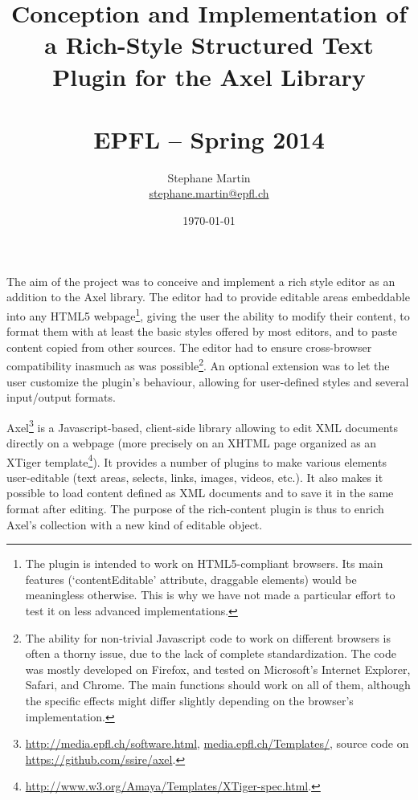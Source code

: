 \documentclass[11pt,a4paper]{article}
\begin{document}
\title{Conception and Implementation of a Rich-Style Structured Text Plugin for the Axel Library\\\\{\large EPFL -- Spring 2014}}
\author{Stephane Martin\\
   \url{stephane.martin@epfl.ch}}
\date{\today}
 
\maketitle

The aim of the project was to conceive and implement a rich style editor as an addition to the Axel library. The editor had to provide editable areas embeddable into any HTML5 webpage\footnote{The plugin is intended to work on HTML5-compliant browsers. Its main features (`contentEditable' attribute, draggable elements) would be meaningless otherwise. This is why we have not made a particular effort to test it on less advanced implementations.}, giving the user the ability to modify their content, to format them with at least the basic styles offered by most editors, and to paste content copied from other sources. The editor had to ensure cross-browser compatibility inasmuch as was possible\footnote{The ability for non-trivial Javascript code to work on different browsers is often a thorny issue, due to the lack of complete standardization. The code was mostly developed on Firefox, and tested on Microsoft's Internet Explorer, Safari, and Chrome. The main functions should work on all of them, although the specific effects might differ slightly depending on the browser's implementation.}. An optional extension was to let the user customize the plugin's behaviour, allowing for user-defined styles and several input/output formats. 


Axel\footnote{\url{http://media.epfl.ch/software.html}, \url{media.epfl.ch/Templates/}, source code on \url{https://github.com/ssire/axel}.} is a Javascript-based, client-side library allowing to edit XML documents directly on a webpage (more precisely on an XHTML page organized as an XTiger template\footnote{\url{http://www.w3.org/Amaya/Templates/XTiger-spec.html}.}). It provides a number of plugins to make various elements user-editable (text areas, selects, links, images, videos, etc.). It also makes it possible to load content defined as XML documents and to save it  in the same format after editing. The purpose of the rich-content plugin is thus to enrich Axel's collection with a new kind of editable object.
\end{document}
